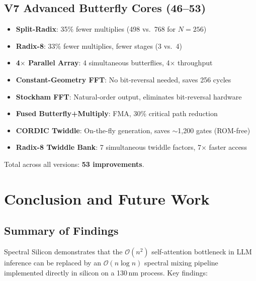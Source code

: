 \documentclass[11pt,a4paper]{article}
\theoremstyle{definition}
\theoremstyle{remark}
\newcommand{\bigO}{\mathcal{O}}
\begin{document}
\subsection{V7 Advanced Butterfly Cores (46--53)}
\begin{itemize}[noitemsep]
  \item \textbf{Split-Radix}: 35\% fewer multiplies (498 vs.\ 768 for $N=256$)
  \item \textbf{Radix-8}: 33\% fewer multiplies, fewer stages (3 vs.\ 4)
  \item \textbf{4$\times$ Parallel Array}: 4 simultaneous butterflies, 4$\times$ throughput
  \item \textbf{Constant-Geometry FFT}: No bit-reversal needed, saves 256 cycles
  \item \textbf{Stockham FFT}: Natural-order output, eliminates bit-reversal hardware
  \item \textbf{Fused Butterfly+Multiply}: FMA, 30\% critical path reduction
  \item \textbf{CORDIC Twiddle}: On-the-fly generation, saves $\sim$1{,}200 gates (ROM-free)
  \item \textbf{Radix-8 Twiddle Bank}: 7 simultaneous twiddle factors, 7$\times$ faster access
\end{itemize}

Total across all versions: \textbf{53 improvements}.

\section{Conclusion and Future Work}

\subsection{Summary of Findings}

Spectral Silicon demonstrates that the $\bigO(n^2)$ self-attention bottleneck in
LLM inference can be replaced by an $\bigO(n \log n)$ spectral mixing pipeline
implemented directly in silicon on a 130\,nm process. Key findings:
\end{document}
